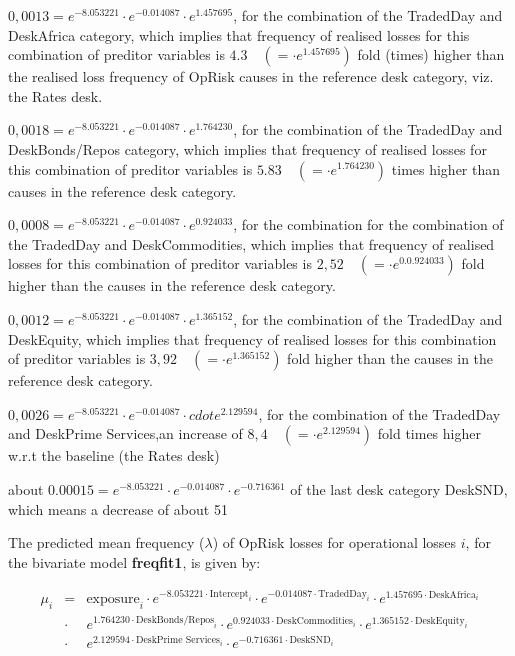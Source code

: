 \documentclass{DissertateUSU}
\begin{document}
\begin{list}{*}{}
\item $0,0013 = e^{-8.053221}\cdot e^{-0.014087}\cdot e^{1.457695}$, for the combination of the TradedDay and DeskAfrica category, which implies that frequency of realised losses for this combination of preditor variables is $4.3 \quad (=\cdot e^{1.457695})$ fold (times) higher than the realised loss frequency of OpRisk causes in the reference desk category, viz. the Rates desk. 
\item $0,0018 = e^{-8.053221}\cdot e^{-0.014087}\cdot e^{1.764230}$, for the combination of the TradedDay and DeskBonds/Repos category, which implies that frequency of realised losses for this combination of preditor variables is $5.83 \quad (=\cdot e^{1.764230})$ times higher than causes in the reference desk category.
\item $0,0008 = e^{-8.053221}\cdot e^{-0.014087}\cdot  e^{0.924033}$, for the combination  for the combination of the TradedDay and DeskCommodities, which implies that frequency of realised losses for this combination of preditor variables is $2,52 \quad (=\cdot e^{0.0.924033})$ fold higher than the causes in the reference desk category.
\item $0,0012 = e^{-8.053221}\cdot e^{-0.014087}\cdot  e^{1.365152}$, for the combination of the TradedDay and DeskEquity, which implies that frequency of realised losses for this combination of preditor variables is $3,92 \quad (=\cdot e^{1.365152})$ fold higher than the causes in the reference desk category.
\item $0,0026 = e^{-8.053221}\cdot e^{-0.014087}\cdot cdot e^{2.129594}$, for the combination of the TradedDay and DeskPrime Services,an increase of $8,4 \quad (=\cdot e^{2.129594})$ fold times higher w.r.t the baseline (the Rates desk)
\item about $0.00015 = e^{-8.053221}\cdot e^{-0.014087}\cdot  e^{-0.716361}$ of the last desk category DeskSND, which means a decrease of about 51%
\end{list}

The predicted mean frequency (\(\lambda\)) of OpRisk losses for
operational losses \(i\), for the bivariate model \textbf{freqfit1}, is
given by:

\singlespacing

\begin{eqnarray}
\mu_{i}& = &\mbox{exposure}_i\cdot e^{-8.053221\cdot \mbox{Intercept}_i}\cdot e^{-0.014087\cdot \mbox{TradedDay}_i}\cdot e^{1.457695\cdot \mbox{DeskAfrica}_i}\nonumber\\
&\cdot&e^{1.764230\cdot \mbox{DeskBonds/Repos}_i}\cdot e^{0.924033\cdot \mbox{DeskCommodities}_i}\cdot e^{1.365152\cdot \mbox{DeskEquity}_i}\nonumber\\
&\cdot& e^{2.129594\cdot \mbox{DeskPrime Services}_i}\cdot e^{-0.716361\cdot \mbox{DeskSND}_i}
\end{eqnarray} \doublespacing
\end{document}
